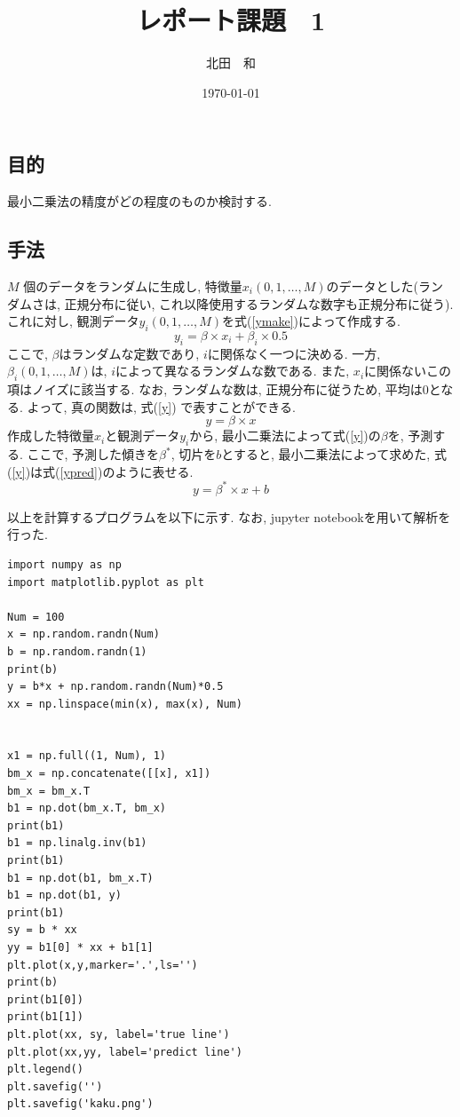 \documentclass{jsarticle}
\title{レポート課題　1}
\date{\today}
\author{北田　和}
\begin{document}
\maketitle
\newpage


\section{}

\subsection{目的}
最小二乗法の精度がどの程度のものか検討する. 

\subsection{手法}
$M$ 個のデータをランダムに生成し, 特徴量$x_i(0, 1, \dots, M)$のデータとした(ランダムさは, 正規分布に従い, これ以降使用するランダムな数字も正規分布に従う). 
これに対し, 観測データ$y_i(0, 1, \dots, M)$を式(\ref{ymake})によって作成する.
\begin{equation}
\label{ymake}
y_i = \beta \times x_i + \beta_i \times 0.5
\end{equation}
ここで, $\beta$はランダムな定数であり, $i$に関係なく一つに決める. 
一方, $\beta_i(0, 1, \dots, M)$は, $i$によって異なるランダムな数である. 
また, $x_i$に関係ないこの項はノイズに該当する. 
なお, ランダムな数は, 正規分布に従うため, 平均は0となる. 
よって, 真の関数は, 式(\ref{y}) で表すことができる. 
\begin{equation}
\label{y}
y = \beta \times x
\end{equation}
作成した特徴量$x_i$と観測データ$y_i$から, 最小二乗法によって式(\ref{y})の$\beta$を, 予測する. 
ここで, 予測した傾きを$\beta^*$, 切片を$b$とすると, 最小二乗法によって求めた, 式(\ref{y})は式(\ref{ypred})のように表せる. 
\begin{equation}
\label{ypred}
y = \beta^* \times x + b
\end{equation}


以上を計算するプログラムを以下に示す.
なお, jupyter notebookを用いて解析を行った. 



\scriptsize
\begin{verbatim}
import numpy as np
import matplotlib.pyplot as plt

Num = 100
x = np.random.randn(Num)
b = np.random.randn(1)
print(b)
y = b*x + np.random.randn(Num)*0.5
xx = np.linspace(min(x), max(x), Num)


x1 = np.full((1, Num), 1)
bm_x = np.concatenate([[x], x1])
bm_x = bm_x.T
b1 = np.dot(bm_x.T, bm_x)
print(b1)
b1 = np.linalg.inv(b1)
print(b1)
b1 = np.dot(b1, bm_x.T)
b1 = np.dot(b1, y)
print(b1)
sy = b * xx
yy = b1[0] * xx + b1[1]
plt.plot(x,y,marker='.',ls='')
print(b)
print(b1[0])
print(b1[1])
plt.plot(xx, sy, label='true line')
plt.plot(xx,yy, label='predict line')
plt.legend()
plt.savefig('')
plt.savefig('kaku.png')
\end{verbatim}
\normalsize
\end{document}
